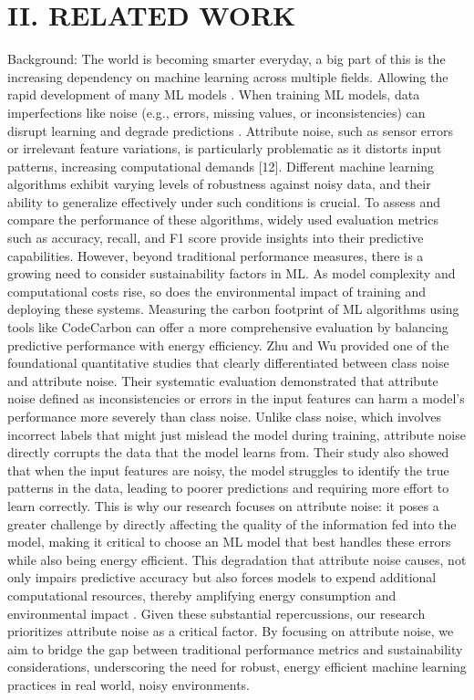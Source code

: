 \documentclass[conference]{IEEEtran}
\begin{document}
\section*{II. RELATED WORK}
Background: The world is becoming smarter everyday, a big part of this is the increasing dependency on machine learning across multiple fields. Allowing the rapid development of many ML models \cite{bain_ai_sustainability}. When training ML models, data imperfections like noise (e.g., errors, missing values, or inconsistencies) can disrupt learning and degrade predictions \cite{sciencedirect_noise}. Attribute noise, such as sensor errors or irrelevant feature variations, is particularly problematic as it distorts input patterns, increasing computational demands [12]. Different machine learning algorithms exhibit varying levels of robustness against noisy data, and their ability to generalize effectively under such conditions is crucial. To assess and compare the performance of these algorithms, widely used evaluation metrics such as accuracy, recall, and F1 score provide insights into their predictive capabilities. However, beyond traditional performance measures, there is a growing need to consider sustainability factors in ML. As model complexity and computational costs rise, so does the environmental impact of training and deploying these systems. Measuring the carbon footprint of ML algorithms using tools like CodeCarbon can offer a more comprehensive evaluation by balancing predictive performance with energy efficiency.
\newline
\newline
Zhu and Wu \cite{wuzu} provided one of the foundational quantitative studies that clearly differentiated between class noise and attribute noise. Their systematic evaluation demonstrated that attribute noise defined as inconsistencies or errors in the input features can harm a model's performance more severely than class noise. Unlike class noise, which involves incorrect labels that might just mislead the model during training, attribute noise directly corrupts the data that the model learns from. Their study also showed that when the input features are noisy, the model struggles to identify the true patterns in the data, leading to poorer predictions and requiring more effort to learn correctly. This is why our research focuses on attribute noise: it poses a greater challenge by directly affecting the quality of the information fed into the model, making it critical to choose an ML model that best handles these errors while also being energy efficient.
\newline
\newline
This degradation that attribute noise causes, not only impairs predictive accuracy but also forces models to expend additional computational resources, thereby amplifying energy consumption and environmental impact \cite{wuzu}. Given these substantial repercussions, our research prioritizes attribute noise as a critical factor. By focusing on attribute noise, we aim to bridge the gap between traditional performance metrics and sustainability considerations, underscoring the need for robust, energy efficient machine learning practices in real world, noisy environments.
\end{document}
